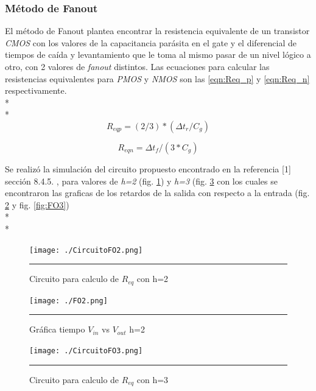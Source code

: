 \documentclass[12pt,a4paper]{article} %
\begin{document}
{\subsubsection{Método de Fanout}

El método de Fanout plantea encontrar la resistencia equivalente de un transistor \textit{CMOS} con los valores de la capacitancia parásita en el gate y el diferencial de tiempos de caída y levantamiento que le toma al mismo pasar de un nivel lógico a otro, con 2 valores de \textit{fanout} distintos. Las ecuaciones para calcular las resistencias equivalentes para \textit{PMOS} y \textit{NMOS} son las \ref{eqn:Req_p} y \ref{eqn:Req_n} respectivamente.\\*
\\*
\begin{equation}\label{eqn:Req_p}
R_{eqp}=(2/3)*( \Delta t_{r}/C_{g})
\end{equation}

\begin{equation}\label{eqn:Req_n}
R_{eqn}= \Delta t_{f}/(3*C_{g})
\end{equation}

Se realizó la simulación del circuito propuesto encontrado en la referencia [1] sección 8.4.5. , para valores de \textit{h=2} (fig. \ref{fig:CircuitoFO2}) y \textit{h=3} (fig. \ref{fig:CircuitoFO3} con los cuales se encontraron las graficas de los retardos de la salida con respecto a la entrada (fig. \ref{fig:FO2} y fig. \ref{fig:FO3})\\*
\\*
\begin{figure}[htbp]
\begin{center}
    \texttt{[image: ./CircuitoFO2.png]}
    \rule{35em}{0.5pt}
  \caption[Captura]{Circuito para calculo de $R_{eq}$ con h=2}
  \label{fig:CircuitoFO2}
  \end{center}
\end{figure}

\begin{figure}[htbp]
  \centering
    \texttt{[image: ./FO2.png]}
    \rule{35em}{1pt}
  \caption[Captura]{Gráfica tiempo $V_{in}$ vs $V_{out}$ h=2}
  \label{fig:FO2}
\end{figure}

\begin{figure}[htbp]
\begin{center}
    \texttt{[image: ./CircuitoFO3.png]}
    \rule{35em}{0.5pt}
  \caption[Captura]{Circuito para calculo de $R_{eq}$ con h=3}
  \label{fig:CircuitoFO3}
  

\end{center}
\end{figure}}
\end{document}
